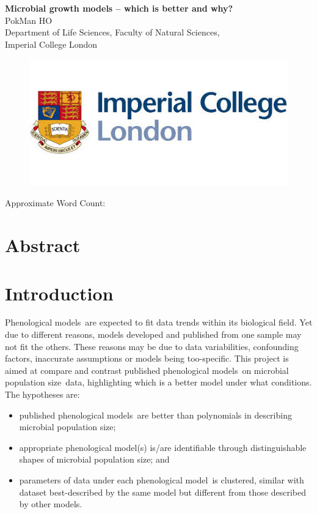 \documentclass[a4paper, 11pt]{article}
\title{\ReportTitle}
\author{\ReportAuthor\ (CID: 01786076)}
\date{}
\newcommand{\pml}{phenological model}
\newcommand{\pms}{phenological models}
\newcommand{\Pms}{Phenological models}
\newcommand{\ReportTitle}{Microbial growth models -- which is better and why?} %
\newcommand{\ReportAuthor}{PokMan HO}
\newcommand{\ReportAffil}{Department of Life Sciences, Faculty of Natural Sciences,\\Imperial College London}
\newcommand{\pop}{population size}
\begin{document}
	\begin{center}
		\Huge\textbf{\ReportTitle}\\
		\LARGE\ReportAuthor\\
		\Large\ReportAffil
	\end{center}
	\begin{figure}[h]
		\centering\includegraphics[width=\linewidth]{icl.jpg}
	\end{figure}
	\begin{flushright}
		\Large Approximate Word Count: %
	\end{flushright}
	\clearpage
	
	\maketitle
	\section*{Abstract}
	
	
	\section*{Introduction}
	\Pms\ are expected to fit data trends within its biological field.  Yet due to different reasons, models developed and published from one sample may not fit the others.  These reasons may be due to data variabilities, confounding factors, inaccurate assumptions or models being too-specific.  This project is aimed at compare and contrast published \pms\ on microbial \pop\ data, highlighting which is a better model under what conditions.  The hypotheses are:
	\begin{itemize}
		\item published \pms\ are better than polynomials in describing microbial \pop;
		\item appropriate \pml(s) is/are identifiable through distinguishable shapes of microbial \pop; and
		\item parameters of data under each \pml\ is clustered, similar with dataset best-described by the same model but different from those described by other models.
	\end{itemize}
	
\end{document}
